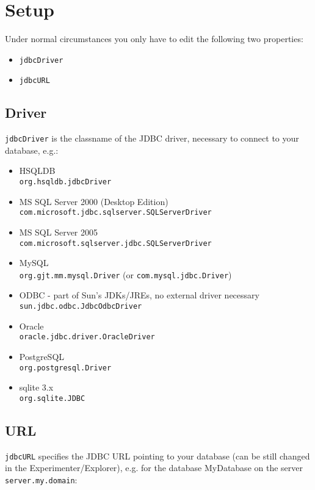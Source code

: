 \section{Setup}
Under normal circumstances you only have to edit the following two properties:

\begin{itemize}
	\item \texttt{jdbcDriver}
	\item \texttt{jdbcURL}
\end{itemize}

\subsection*{Driver}
\texttt{jdbcDriver} is the classname of the JDBC driver, necessary to connect to your database, e.g.:

\begin{itemize}
	\item HSQLDB \\
	\texttt{org.hsqldb.jdbcDriver}
	\item MS SQL Server 2000 (Desktop Edition) \\
	\texttt{com.microsoft.jdbc.sqlserver.SQLServerDriver}
	\item MS SQL Server 2005 \\
	\texttt{com.microsoft.sqlserver.jdbc.SQLServerDriver}
	\item MySQL \\
	\texttt{org.gjt.mm.mysql.Driver} (or \texttt{com.mysql.jdbc.Driver})
	\item ODBC - part of Sun's JDKs/JREs, no external driver necessary \\
	\texttt{sun.jdbc.odbc.JdbcOdbcDriver}
	\item Oracle \\
	\texttt{oracle.jdbc.driver.OracleDriver}
	\item PostgreSQL \\
	\texttt{org.postgresql.Driver}
	\item sqlite 3.x \\
	\texttt{org.sqlite.JDBC}
\end{itemize}

\subsection*{URL}
\texttt{jdbcURL} specifies the JDBC URL pointing to your database (can be still changed in the Experimenter/Explorer), e.g. for the database MyDatabase on the server \texttt{server.my.domain}:

